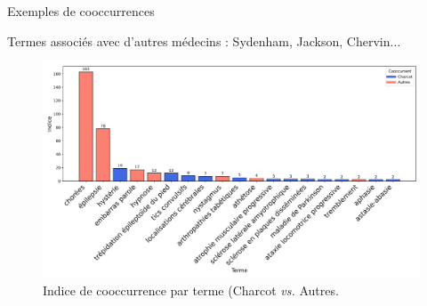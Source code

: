 \begin{frame}{Exemples de cooccurrences}
	
	Termes associés avec d'autres médecins : Sydenham, Jackson, Chervin$\dots$ 
		\begin{figure}[h]
		\centering
		\includegraphics[width=\linewidth]{pic/cooccurrences.png}
		\caption{Indice de cooccurrence par terme (Charcot \textit{vs.} Autres.}
		\label{fig:ling_out_TAL}
	\end{figure}
\end{frame}



